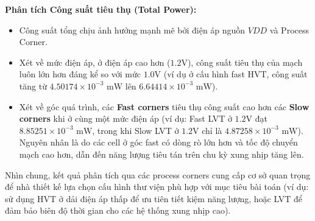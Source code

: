 \documentclass[12pt,a4paper,oneside]{book}
\begin{document}
\textbf{Phân tích Công suất tiêu thụ (Total Power):}
\begin{itemize}
    \item Công suất tổng chịu ảnh hưởng mạnh mẽ bởi điện áp nguồn $VDD$ và Process Corner.
    \item Xét về mức điện áp, ở điện áp cao hơn ($1.2\text{V}$), công suất tiêu thụ của mạch luôn lớn hơn đáng kể so với mức $1.0\text{V}$ (ví dụ ở cấu hình fast HVT, công suất tăng từ $4.50174 \times 10^{-3}\text{ mW}$ lên $6.64414 \times 10^{-3}\text{ mW}$).
    \item Xét về góc quá trình, các \textbf{Fast corners} tiêu thụ công suất cao hơn các \textbf{Slow corners} khi ở cùng một mức điện áp (ví dụ: Fast LVT ở $1.2\text{V}$ đạt $8.85251 \times 10^{-3}\text{ mW}$, trong khi Slow LVT ở $1.2\text{V}$ chỉ là $4.87258 \times 10^{-3}\text{ mW}$). Nguyên nhân là do các cell ở góc fast có dòng rò lớn hơn và tốc độ chuyển mạch cao hơn, dẫn đến năng lượng tiêu tán trên chu kỳ xung nhịp tăng lên.
\end{itemize}

Nhìn chung, kết quả phân tích qua các process corners cung cấp cơ sở quan trọng để nhà thiết kế lựa chọn cấu hình thư viện phù hợp với mục tiêu bài toán (ví dụ: sử dụng HVT ở dải điện áp thấp để ưu tiên tiết kiệm năng lượng, hoặc LVT để đảm bảo biên độ thời gian cho các hệ thống xung nhịp cao).
\end{document}
